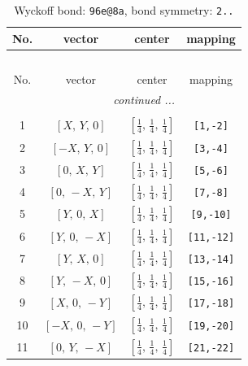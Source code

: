 \documentclass[fleqn,8pt]{jsarticle}
\begin{document}
\begin{longtable}{cccc}
\caption{Wyckoff bond: {\tt 96e@8a}, bond symmetry: {\tt 2..}}
 \\
 \hline \hline
No. & vector & center & mapping \\ \hline \endfirsthead

\multicolumn{3}{l}{\tablename\ \thetable{}} \\
 \hline \hline
No. & vector & center & mapping \\ \hline \endhead

 \hline \hline
\multicolumn{3}{r}{\footnotesize\it continued ...} \\ \endfoot

 \hline \hline
\multicolumn{3}{r}{} \\ \endlastfoot

1 & $\left[ X,\, Y,\, 0 \right]$ & $\left[ \frac{1}{4},\, \frac{1}{4},\, \frac{1}{4} \right]$ & {\tt [1,-2]} \\ \hline
2 & $\left[ - X,\, Y,\, 0 \right]$ & $\left[ \frac{1}{4},\, \frac{1}{4},\, \frac{1}{4} \right]$ & {\tt [3,-4]} \\ \hline
3 & $\left[ 0,\, X,\, Y \right]$ & $\left[ \frac{1}{4},\, \frac{1}{4},\, \frac{1}{4} \right]$ & {\tt [5,-6]} \\ \hline
4 & $\left[ 0,\, - X,\, Y \right]$ & $\left[ \frac{1}{4},\, \frac{1}{4},\, \frac{1}{4} \right]$ & {\tt [7,-8]} \\ \hline
5 & $\left[ Y,\, 0,\, X \right]$ & $\left[ \frac{1}{4},\, \frac{1}{4},\, \frac{1}{4} \right]$ & {\tt [9,-10]} \\ \hline
6 & $\left[ Y,\, 0,\, - X \right]$ & $\left[ \frac{1}{4},\, \frac{1}{4},\, \frac{1}{4} \right]$ & {\tt [11,-12]} \\ \hline
7 & $\left[ Y,\, X,\, 0 \right]$ & $\left[ \frac{1}{4},\, \frac{1}{4},\, \frac{1}{4} \right]$ & {\tt [13,-14]} \\ \hline
8 & $\left[ Y,\, - X,\, 0 \right]$ & $\left[ \frac{1}{4},\, \frac{1}{4},\, \frac{1}{4} \right]$ & {\tt [15,-16]} \\ \hline
9 & $\left[ X,\, 0,\, - Y \right]$ & $\left[ \frac{1}{4},\, \frac{1}{4},\, \frac{1}{4} \right]$ & {\tt [17,-18]} \\ \hline
10 & $\left[ - X,\, 0,\, - Y \right]$ & $\left[ \frac{1}{4},\, \frac{1}{4},\, \frac{1}{4} \right]$ & {\tt [19,-20]} \\ \hline
11 & $\left[ 0,\, Y,\, - X \right]$ & $\left[ \frac{1}{4},\, \frac{1}{4},\, \frac{1}{4} \right]$ & {\tt [21,-22]} \\ \hline

\end{longtable}
\end{document}
